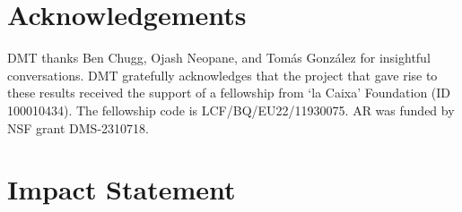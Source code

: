 \documentclass{article}
\theoremstyle{plain}
\theoremstyle{definition}
\theoremstyle{remark}
\begin{document}
\printAffiliationsAndNotice{}  %

\begin{abstract}
  We develop novel ``empirical Bernstein'' inequalities for the variance of bounded random variables. Our inequalities hold under constant conditional variance and mean, without further assumptions like independence or identical distribution of the random variables, making them suitable for sequential decision making contexts. The results are instantiated for both the batch setting (where the sample size is fixed) and the sequential setting (where the sample size is a stopping time). Our bounds are asymptotically ``sharp'': when the data are iid, our CI adapts optimally to both unknown mean $\mu$ and unknown $\mathbb{V}[(X-\mu)^2]$, meaning that the first order term of our CI \emph{exactly} matches that of the oracle Bernstein inequality which knows those quantities. We compare our results to a widely used (non-sharp) concentration inequality for the variance based on self-bounding random variables, showing both the theoretical gains and improved empirical performance of our approach. We finally extend our methods to work in any separable Hilbert space.
\end{abstract}
















\section*{Acknowledgements}

DMT thanks Ben Chugg, Ojash Neopane, and Tomás González for insightful conversations. DMT gratefully
acknowledges that the project that gave rise to these results received the support of a fellowship
from ‘la Caixa’ Foundation (ID 100010434). The fellowship code is LCF/BQ/EU22/11930075. 
AR was funded by NSF grant DMS-2310718.

\section*{Impact Statement}
\end{document}
